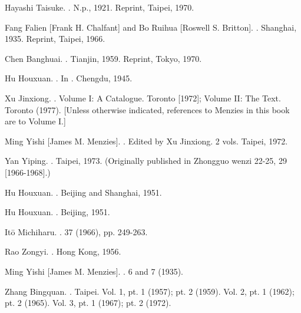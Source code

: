 \begin{list}{}
  \item[Kikkō] Hayashi Taisuke. . N.p., 1921. Reprint, Taipei, 1970.
  \item[Kufang] Fang Falien [Frank H. Chalfant] and Bo Ruihua [Roswell S. Britton]. . Shanghai, 1935. Reprint, Taipei, 1966.
  \item[Lingshi] Chen Banghuai. . Tianjin, 1959. Reprint, Tokyo, 1970.
  \item[Liulu] Hu Houxuan. . In . Chengdu, 1945.
  \item[Menzies] Xu Jinxiong. . Volume I: A Catalogue. Toronto [1972]; Volume II: The Text. Toronto (1977). [Unless otherwise indicated, references to Menzies in this book are to Volume I.]
  \item[Minghou] Ming Yishi [James M. Menzies]. . Edited by Xu Jinxiong. 2 vols. Taipei, 1972.
  \item[Naersen] Yan Yiping. . Taipei, 1973. (Originally published in Zhongguo wenzi 22-25, 29 [1966-1968].)
  \item[Nanbei] Hu Houxuan. . Beijing and Shanghai, 1951.
  \item[Ninghu] Hu Houxuan. . Beijing, 1951.
  \item[Ogawa] Itō Michiharu. .  37 (1966), pp. 249-263.
  \item[Bali] Rao Zongyi. . Hong Kong, 1956.
  \item[Baigen] Ming Yishi [James M. Menzies]. .  6 and 7 (1935).
  \item[Pingbian] Zhang Bingquan. . Taipei. Vol. 1, pt. 1 (1957); pt. 2 (1959). Vol. 2, pt. 1 (1962); pt. 2 (1965). Vol. 3, pt. 1 (1967); pt. 2 (1972).

\end{list}
